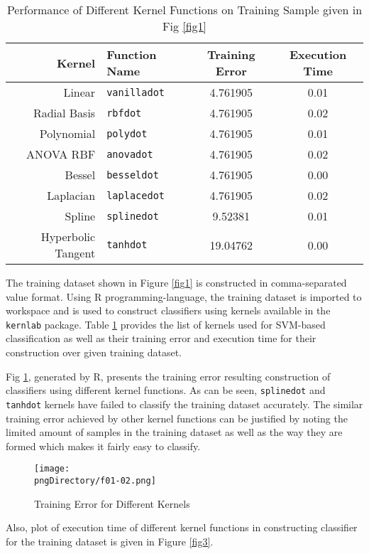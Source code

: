 \begin{table}[H]\centering
\begin{tabular}{r l c c}
Kernel & Function Name & Training Error & Execution Time\\
\hline
Linear & \texttt{vanilladot} & 4.761905 & 0.01\\
Radial Basis & \texttt{rbfdot} & 4.761905 & 0.02\\
Polynomial & \texttt{polydot} & 4.761905 & 0.01\\
ANOVA RBF & \texttt{anovadot} & 4.761905 & 0.02\\
Bessel & \texttt{besseldot} & 4.761905 & 0.00\\
Laplacian & \texttt{laplacedot} & 4.761905 & 0.02\\
Spline & \texttt{splinedot} & 9.52381 & 0.01\\
Hyperbolic Tangent & \texttt{tanhdot} & 19.04762 & 0.00\\
\hline
\end{tabular}
\caption{Performance of Different Kernel Functions on Training Sample given in Fig \ref{fig1}}\label{tab1}
\end{table}

The training dataset shown in Figure \ref{fig1} is constructed in comma-separated value format.
Using R programming-language, the training dataset is imported to workspace and is used to construct classifiers using kernels available in the \texttt{kernlab} package.
Table \ref{tab1} provides the list of kernels used for SVM-based classification as well as their training error and execution time for their construction over given training dataset.

Fig \ref{fig2}, generated by R, presents the training error resulting construction of  classifiers using different kernel functions.
As can be seen, \texttt{splinedot} and \texttt{tanhdot} kernels have failed to classify the training dataset accurately.
The similar training error achieved by other kernel functions can be justified by noting the limited amount of samples in the training dataset as well as the way they are formed  which makes it fairly easy to classify.

\begin{figure}\centering
\texttt{[image: \\pngDirectory/f01-02.png]}
\caption{Training Error for Different Kernels}\label{fig2}
\end{figure}

Also, plot of execution time of different kernel functions in constructing classifier for the training dataset is given in Figure \ref{fig3}.

